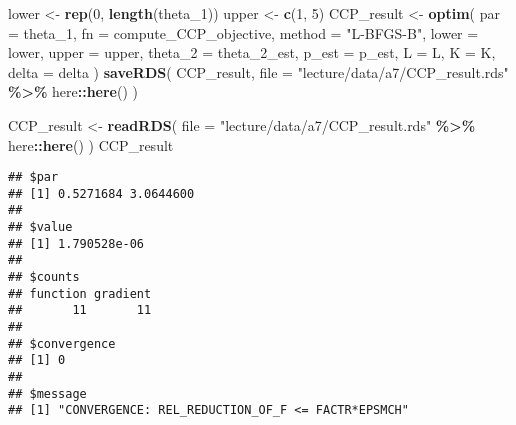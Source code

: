 \documentclass[
]{book}
\newenvironment{Shaded}{\begin{snugshade}}{\end{snugshade}}
\newcommand{\AttributeTok}[1]{\textcolor[rgb]{0.13,0.29,0.53}{#1}}
\newcommand{\DecValTok}[1]{\textcolor[rgb]{0.00,0.00,0.81}{#1}}
\newcommand{\FunctionTok}[1]{\textcolor[rgb]{0.13,0.29,0.53}{\textbf{#1}}}
\newcommand{\NormalTok}[1]{#1}
\newcommand{\OtherTok}[1]{\textcolor[rgb]{0.56,0.35,0.01}{#1}}
\newcommand{\SpecialCharTok}[1]{\textcolor[rgb]{0.81,0.36,0.00}{\textbf{#1}}}
\newcommand{\StringTok}[1]{\textcolor[rgb]{0.31,0.60,0.02}{#1}}
\begin{document}
\begin{Shaded}
\begin{Highlighting}[]
\NormalTok{lower }\OtherTok{\textless{}{-}} \FunctionTok{rep}\NormalTok{(}\DecValTok{0}\NormalTok{, }\FunctionTok{length}\NormalTok{(theta\_1))}
\NormalTok{upper }\OtherTok{\textless{}{-}} \FunctionTok{c}\NormalTok{(}\DecValTok{1}\NormalTok{, }\DecValTok{5}\NormalTok{)}
\NormalTok{CCP\_result }\OtherTok{\textless{}{-}}
  \FunctionTok{optim}\NormalTok{(}
        \AttributeTok{par =}\NormalTok{ theta\_1,}
        \AttributeTok{fn =}\NormalTok{ compute\_CCP\_objective,}
        \AttributeTok{method =} \StringTok{"L{-}BFGS{-}B"}\NormalTok{,}
        \AttributeTok{lower =}\NormalTok{ lower,}
        \AttributeTok{upper =}\NormalTok{ upper,}
        \AttributeTok{theta\_2 =}\NormalTok{ theta\_2\_est, }
        \AttributeTok{p\_est =}\NormalTok{ p\_est, }
        \AttributeTok{L =}\NormalTok{ L, }
        \AttributeTok{K =}\NormalTok{ K, }
        \AttributeTok{delta =}\NormalTok{ delta}
\NormalTok{        )}
\FunctionTok{saveRDS}\NormalTok{(}
\NormalTok{  CCP\_result, }
  \AttributeTok{file =} \StringTok{"lecture/data/a7/CCP\_result.rds"} \SpecialCharTok{\%\textgreater{}\%}\NormalTok{ here}\SpecialCharTok{::}\FunctionTok{here}\NormalTok{()}
\NormalTok{)}
\end{Highlighting}
\end{Shaded}

\begin{Shaded}
\begin{Highlighting}[]
\NormalTok{CCP\_result }\OtherTok{\textless{}{-}} 
  \FunctionTok{readRDS}\NormalTok{(}
    \AttributeTok{file =} \StringTok{"lecture/data/a7/CCP\_result.rds"} \SpecialCharTok{\%\textgreater{}\%}\NormalTok{ here}\SpecialCharTok{::}\FunctionTok{here}\NormalTok{()}
\NormalTok{  )}
\NormalTok{CCP\_result}
\end{Highlighting}
\end{Shaded}

\begin{verbatim}
## $par
## [1] 0.5271684 3.0644600
## 
## $value
## [1] 1.790528e-06
## 
## $counts
## function gradient 
##       11       11 
## 
## $convergence
## [1] 0
## 
## $message
## [1] "CONVERGENCE: REL_REDUCTION_OF_F <= FACTR*EPSMCH"
\end{verbatim}

\begin{Shaded}
\end{Shaded}
\end{document}
